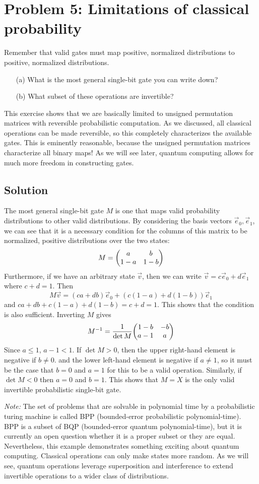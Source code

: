 \documentclass{article}
\begin{document}
\section*{Problem 5: Limitations of classical probability}
Remember that valid gates must map positive, normalized distributions to positive, normalized distributions.
\begin{itemize}
\item[(a)] What is the most general single-bit gate you can write down? 
\item[(b)] What subset of these operations are invertible?
\end{itemize}
This exercise shows that we are basically limited to unsigned permutation matrices with reversible probabilistic computation. As we discussed, all classical operations can be made reversible, so this completely characterizes the available gates. This is eminently reasonable, because the unsigned permutation matrices characterize all binary maps! As we will see later, quantum computing allows for much more freedom in constructing gates.

\subsection*{Solution}
The most general single-bit gate $M$ is one that maps valid probability distributions to other valid distributions. By considering the basis vectors $\vec e_0, \vec e_1$, we can see that it is a necessary condition for the columns of this matrix to be normalized, positive distributions over the two states:
$$
M = \mqty(a & b \\ 1-a & 1-b)
$$
Furthermore, if we have an arbitrary state $\vec v$, then we can write $\vec v = c\vec e_0 + d \vec e_1$ where $c + d = 1$. Then
$$
M\vec v = (ca+db)\vec e_0 + (c(1-a)+d(1-b))\vec e_1
$$
and $ca + db + c(1-a)+d(1-b) = c+d = 1$. 
This shows that the condition is also sufficient. Inverting $M$ gives
$$
M^{-1} = \frac{1}{\det M}\mqty(1-b & -b \\ a-1 & a)
$$
Since $a \leq 1$, $a-1 < 1$. If $\det M > 0$, then the upper right-hand element is negative if $b \neq 0$. and the lower left-hand element is negative if $a \neq 1$, so it must be the case that $b = 0$ and $a = 1$ for this to be a valid operation. Similarly, if $\det M < 0$ then $a=0$ and $b=1$. This shows that $M=X$ is the only valid invertible probabilistic single-bit gate.
\par \textit{Note:} The set of problems that are solvable in polynomial time by a probabilistic turing machine is called BPP (bounded-error probabilistic polynomial-time). BPP is a subset of BQP (bounded-error quantum polynomial-time), but it is currently an open question whether it is a proper subset or they are equal. Nevertheless, this example demonstrates something exciting about quantum computing. Classical operations can only make states more random. As we will see, quantum operations leverage superposition and interference to extend invertible operations to a wider class of distributions.
\end{document}
